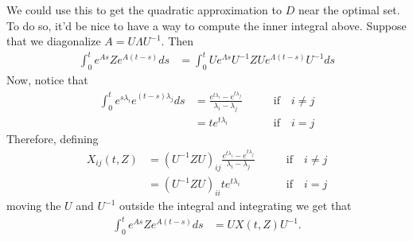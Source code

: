 \documentclass{article}
\newcommand{\1}{\mathbbm{1}}
\begin{document}
We could use this to get the quadratic approximation to $D$ near the optimal set.
To do so, it'd be nice to have a way to compute the inner integral above.
Suppose that we diagonalize $A = U \Lambda U^{-1}$.
Then
\begin{equation} \label{eqn:exp_deriv}
  \begin{aligned}
      \int_0^t e^{As} Z e^{A(t-s)} ds 
      &=
      \int_0^t U e^{\Lambda s} U^{-1} Z U e^{\Lambda (t-s)} U^{-1} ds 
  \end{aligned}
\end{equation}
Now, notice that
\begin{equation}
  \begin{aligned}
      \int_0^t e^{s \lambda_i} e^{(t-s) \lambda_j} ds
      &=
      \frac{ e^{t \lambda_i} - e^{t \lambda_j} }{ \lambda_i - \lambda_j } 
          \qquad & \text{if} \quad i \neq j \\
      &=
          t e^{t \lambda_i} 
          \qquad & \text{if} \quad i = j 
  \end{aligned}
\end{equation}
Therefore, 
defining
\begin{equation}
    \begin{aligned}
    X_{ij}(t,Z) 
       &= 
        \left( U^{-1} Z U \right)_{ij}
      \frac{ e^{t \lambda_i} - e^{t \lambda_j} }{ \lambda_i - \lambda_j } 
          \qquad & \text{if} \quad i \neq j \\
      &=
          \left( U^{-1} Z U \right)_{ii}
          t e^{t \lambda_i} 
          \qquad & \text{if} \quad i = j 
    \end{aligned}
\end{equation}
moving the $U$ and $U^{-1}$ outside the integral and integrating we get that
\begin{equation}
  \begin{aligned}
      \int_0^t e^{As} Z e^{A(t-s)} ds 
      &=
      U X(t,Z) U^{-1} .
  \end{aligned}
\end{equation}
\end{document}
